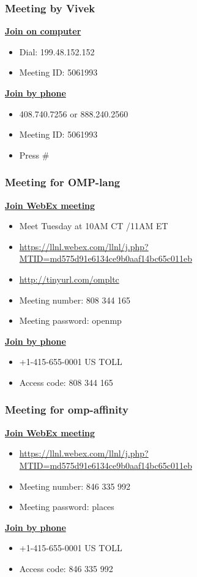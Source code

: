 \begin{frame}[label=mtgPSMimg]
\frametitle{Meeting by Vivek}
\underline{\bf Join on computer}
\begin{itemize}
\small \item \small Dial: 199.48.152.152
\item \small Meeting ID: 5061993
\end{itemize}
\underline{\bf Join by phone}
\begin{itemize}
\small \item \small 408.740.7256 or 888.240.2560
\item \small Meeting ID: 5061993
\item \small Press \#
\end{itemize}
\end{frame}

\begin{frame}[label=omp_lang]
\frametitle{Meeting for OMP-lang}
\underline{\bf Join WebEx meeting}
\begin{itemize}
\small \item \small Meet Tuesday at 10AM CT /11AM ET
\small \item \small \url{https://llnl.webex.com/llnl/j.php?MTID=md575d91e6134ce9b0aaf14bc65c011eb}
\small \item \small \url{http://tinyurl.com/ompltc}
\item \small Meeting number: 808 344 165
\item \small Meeting password: openmp
\end{itemize}
\underline{\bf Join by phone}
\begin{itemize}
\small \item \small +1-415-655-0001 US TOLL
\item \small Access code: 808 344 165
\end{itemize}
\end{frame}

\begin{frame}[label=omp_affinity]
\frametitle{Meeting for omp-affinity}
\underline{\bf Join WebEx meeting}
\begin{itemize}
\small \item \small  \url{https://llnl.webex.com/llnl/j.php?MTID=md575d91e6134ce9b0aaf14bc65c011eb}
\item \small Meeting number: 846 335 992
\item \small Meeting password: places
\end{itemize}
\underline{\bf Join by phone}
\begin{itemize}
\item +1-415-655-0001 US TOLL
\item Access code: 846 335 992
\end{itemize}
\end{frame}


